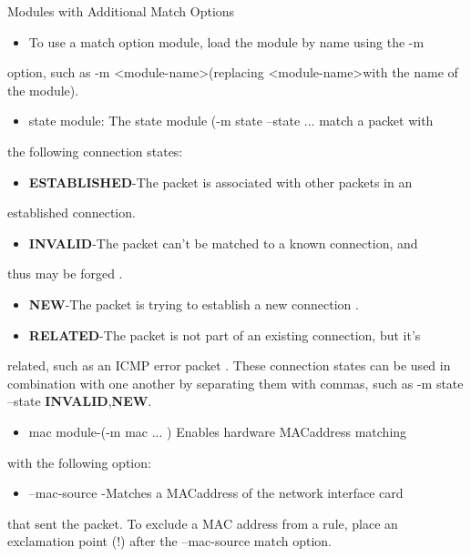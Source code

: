 \begin{frame}[t,allowframebreaks]{Modules with Additional Match Options}
  \fontsize{15}{18}\selectfont
  \begin{itemize}
    \item To use a match option module, load the module by name using the -m
  \end{itemize}
  option, such as -m <module-name>(replacing <module-name>with the name of the module).\par
  \begin{itemize}
    \item state module: The state module (-m state --state ... match a packet with
  \end{itemize}
  the following connection states:\par
  \begin{itemize}
    \item \textcolor{WarningColor}{\bfseries ESTABLISHED}-The packet is associated with other packets in an
  \end{itemize}
  established connection.\par
  \begin{itemize}
    \item \textcolor{WarningColor}{\bfseries INVALID}-The packet can't be matched to a known connection, and
  \end{itemize}
  thus may be forged .\par
  \begin{itemize}
    \item \textcolor{WarningColor}{\bfseries NEW}-The packet is trying to establish a new connection .
    \item \textcolor{WarningColor}{\bfseries RELATED}-The packet is not part of an existing connection, but it's
  \end{itemize}
  related, such as an ICMP error packet . These connection states can be used in combination with one another by separating them with commas, such as -m state --state \textcolor{WarningColor}{\bfseries INVALID},\textcolor{WarningColor}{\bfseries NEW}.\par
  \begin{itemize}
    \item mac module-(-m mac ... ) Enables hardware MACaddress matching
  \end{itemize}
  with the following option:\par
  \begin{itemize}
    \item --mac-source -Matches a MACaddress of the network interface card
  \end{itemize}
  that sent the packet. To exclude a MAC address from a rule, place an exclamation point (!) after the --mac-source match option.\par
\end{frame}
